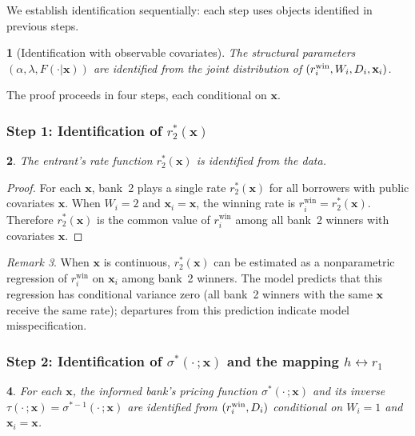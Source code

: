 \documentclass[12pt]{article}
\theoremstyle{plain}
\newtheorem{thm}{\protect\theoremname}
\theoremstyle{plain}
\newtheorem{prop}[thm]{\protect\propositionname}
\theoremstyle{definition}  %
\theoremstyle{remark}  %
\newtheorem{remark}[thm]{Remark}  %
\providecommand{\propositionname}{Proposition}
\providecommand{\theoremname}{Theorem}
\begin{document}
We establish identification sequentially: each step uses objects identified in previous steps.

\begin{thm}[Identification with observable covariates]\label{thm:id}
The structural parameters $(\alpha, \lambda, F(\cdot|\mathbf{x}))$ are identified from the joint distribution of $(r_i^{\textup{win}}, W_i, D_i, \mathbf{x}_i)$.
\end{thm}

The proof proceeds in four steps, each conditional on $\mathbf{x}$.


\subsubsection{Step 1: Identification of $r_2^*(\mathbf{x})$}

\begin{prop}\label{prop:id_r2}
The entrant's rate function $r_2^*(\mathbf{x})$ is identified from the data.
\end{prop}

\begin{proof}
For each $\mathbf{x}$, bank~2 plays a single rate $r_2^*(\mathbf{x})$ for all borrowers with public covariates $\mathbf{x}$. When $W_i = 2$ and $\mathbf{x}_i = \mathbf{x}$, the winning rate is $r_i^{\text{win}} = r_2^*(\mathbf{x})$. Therefore $r_2^*(\mathbf{x})$ is the common value of $r_i^{\text{win}}$ among all bank~2 winners with covariates $\mathbf{x}$.
\end{proof}

\begin{remark}
When $\mathbf{x}$ is continuous, $r_2^*(\mathbf{x})$ can be estimated as a nonparametric regression of $r_i^{\text{win}}$ on $\mathbf{x}_i$ among bank~2 winners. The model predicts that this regression has conditional variance zero (all bank~2 winners with the same $\mathbf{x}$ receive the same rate); departures from this prediction indicate model misspecification.
\end{remark}


\subsubsection{Step 2: Identification of $\sigma^*(\cdot\,;\mathbf{x})$ and the mapping $h \leftrightarrow r_1$}

\begin{prop}\label{prop:id_sigma}
For each $\mathbf{x}$, the informed bank's pricing function $\sigma^*(\cdot\,;\mathbf{x})$ and its inverse $\tau(\cdot\,;\mathbf{x}) = \sigma^{*-1}(\cdot\,;\mathbf{x})$ are identified from $(r_i^{\textup{win}}, D_i)$ conditional on $W_i = 1$ and $\mathbf{x}_i = \mathbf{x}$.
\end{prop}
\end{document}
